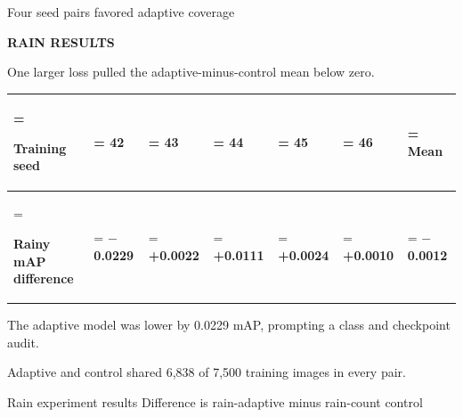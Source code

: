 \documentclass[aspectratio=169,11pt]{beamer}
\newcommand{\credit}[1]{\vfill{\scriptsize\color{muted}#1\par}}
\newcommand{\talkpoint}[2]{%
  \smallskip{\color{accent}\bfseries #1}\enspace #2\par}
\begin{document}
\begin{frame}[t]{Four seed pairs favored adaptive coverage}
{\scriptsize\bfseries\color{accent}RAIN RESULTS\par}
\smallskip
One larger loss pulled the adaptive-minus-control mean below zero.\par\smallskip
\smallskip
{\small
\begin{tabularx}{\linewidth}{>{\hsize=1.7500\hsize\linewidth=\hsize\raggedright\arraybackslash}X>{\hsize=0.8750\hsize\linewidth=\hsize\centering\arraybackslash}X>{\hsize=0.8750\hsize\linewidth=\hsize\centering\arraybackslash}X>{\hsize=0.8750\hsize\linewidth=\hsize\centering\arraybackslash}X>{\hsize=0.8750\hsize\linewidth=\hsize\centering\arraybackslash}X>{\hsize=0.8750\hsize\linewidth=\hsize\centering\arraybackslash}X>{\hsize=0.8750\hsize\linewidth=\hsize\centering\arraybackslash}X}
\toprule
\textcolor{accent}{\textbf{Training seed}} & \textcolor{accent}{\textbf{42}} & \textcolor{accent}{\textbf{43}} & \textcolor{accent}{\textbf{44}} & \textcolor{accent}{\textbf{45}} & \textcolor{accent}{\textbf{46}} & \textcolor{accent}{\textbf{Mean}} \\
\midrule
\textbf{Rainy mAP difference} & \textbf{\ensuremath{-}0.0229} & \textbf{+0.0022} & \textbf{+0.0111} & \textbf{+0.0024} & \textbf{+0.0010} & \textbf{\ensuremath{-}0.0012} \\
\bottomrule
\end{tabularx}
\par}
\talkpoint{Seed 42}{The adaptive model was lower by 0.0229 mAP, prompting a class and checkpoint audit.}
\talkpoint{Subset overlap}{Adaptive and control shared 6,838 of 7,500 training images in every pair.}
\credit{Rain experiment results \textperiodcentered{} Difference is rain-adaptive minus rain-count control}
\end{frame}
\end{document}
